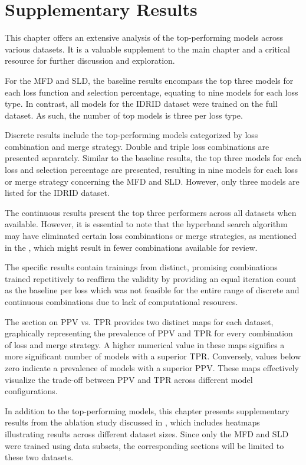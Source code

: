 \chapter{Supplementary Results}
\label{chap:supplementary_results}
This chapter offers an extensive analysis of the top-performing models across various datasets. It is a valuable supplement to the main chapter and a critical resource for further discussion and exploration.

For the \acf{MFD} and \acf{SLD}, the baseline results encompass the top three models for each loss function and selection percentage, equating to nine models for each loss type. In contrast, all models for the \acf{IDRID} dataset were trained on the full dataset. As such, the number of top models is three per loss type.

Discrete results include the top-performing models categorized by loss combination and merge strategy. Double and triple loss combinations are presented separately. Similar to the baseline results, the top three models for each loss and selection percentage are presented, resulting in nine models for each loss or merge strategy concerning the \ac{MFD} and \ac{SLD}. However, only three models are listed for the \ac{IDRID} dataset.

The continuous results present the top three performers across all datasets when available. However, it is essential to note that the hyperband search algorithm may have eliminated certain loss combinations or merge strategies, as mentioned in the , which might result in fewer combinations available for review.

The specific results contain trainings from distinct, promising combinations trained repetitively to reaffirm the validity by providing an equal iteration count as the baseline per loss which was not feasible for the entire range of discrete and continuous combinations due to lack of computational resources.

The section on PPV vs. TPR provides two distinct maps for each dataset, graphically representing the prevalence of \ac{PPV} and \ac{TPR} for every combination of loss and merge strategy. A higher numerical value in these maps signifies a more significant number of models with a superior \ac{TPR}. Conversely, values below zero indicate a prevalence of models with a superior \ac{PPV}. These maps effectively visualize the trade-off between \ac{PPV} and \ac{TPR} across different model configurations.

In addition to the top-performing models, this chapter presents supplementary results from the ablation study discussed in , which includes heatmaps illustrating results across different dataset sizes. Since only the \ac{MFD} and \ac{SLD} were trained using data subsets, the corresponding sections will be limited to these two datasets.

